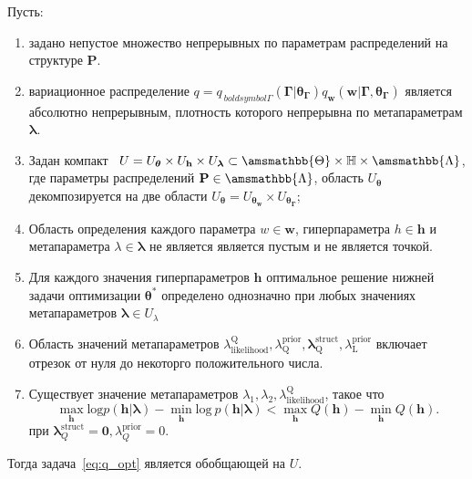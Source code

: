 \begin{theorem}
Пусть:
\begin{enumerate} 
\item задано непустое множество непрерывных по параметрам распределений на структуре $\mathbf{P}$.

\item вариационное распределение $q = q_{\  boldsymbol{\Gamma}}(\boldsymbol{\Gamma}|\boldsymbol{\theta}_{\boldsymbol{\Gamma}}) q_{\mathbf{w}}(\mathbf{w}| \boldsymbol{\Gamma},\boldsymbol{\theta}_{\boldsymbol{\Gamma}})$ является  абсолютно непрерывным, плотность которого непрерывна по метапараметрам $\boldsymbol{\lambda}$.

\item Задан компакт  $U = U_{\boldsymbol{\theta}} \times U_{\mathbf{h}} \times U_{\boldsymbol{\lambda}} \subset \amsmathbb{\Theta} \times \mathbb{H} \times \amsmathbb{\Lambda}$, где параметры распределений $\mathbf{P} \in \amsmathbb{\Lambda}$, область $U_{\boldsymbol{\theta}}$ декомпозируется на две области $U_{\boldsymbol{\theta}} = U_{\boldsymbol{\theta}_{\mathbf{w}}} \times U_{\boldsymbol{\theta}_{\boldsymbol{\Gamma}}}$;
\item Область определения каждого параметра $w \in \mathbf{w}$, гиперпараметра $h \in \mathbf{h}$ и метапараметра $\lambda \in \boldsymbol{\lambda}$ не является является пустым и не является точкой.

\item Для каждого значения гиперпараметров $\mathbf{h}$ оптимальное решение нижней задачи оптимизации $\boldsymbol{\theta}^{*}$ определено однозначно при любых значениях метапараметров $\boldsymbol{\lambda} \in U_{\lambda}$

\item Область значений метапараметров $\lambda_\text{likelihood}^\text{Q}, \lambda^\text{prior}_\text{Q}, \boldsymbol{\lambda}^\text{struct}_\text{Q}, \lambda^\text{prior}_\text{L}$ включает отрезок от нуля до некоторго положительного числа.

\item Существует значение метапараметров $\lambda_1, \lambda_2, \lambda_\text{likelihood}^\text{Q}$, такое что
\[
\max_{\mathbf{h}} \text{log} p (\mathbf{h}|\boldsymbol{\lambda})-\min_{\mathbf{h}} \text{log}~p(\mathbf{h}|\boldsymbol{\lambda}) < \max_{\mathbf{h}} Q(\mathbf{h}) -  \min_{\mathbf{h}} Q(\mathbf{h}).
\] 
при $\boldsymbol{\lambda}^\text{struct}_Q = \mathbf{0}, \lambda^\text{prior}_Q = 0$.

\end{enumerate}
Тогда задача~\eqref{eq:q_opt} является обобщающей на $U$.
\end{theorem}
